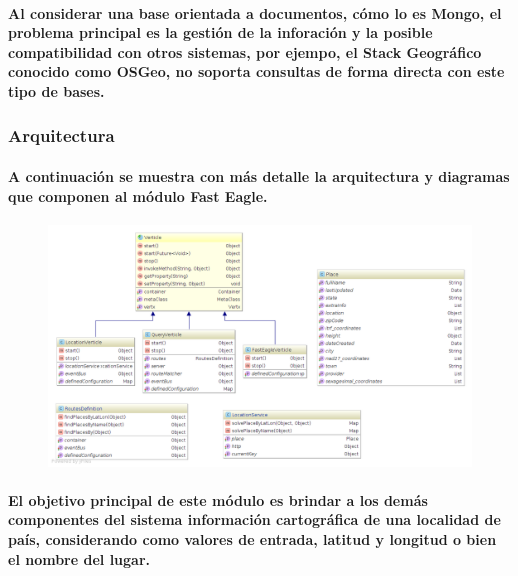     \paragraph{Al considerar una base orientada a documentos, cómo lo es Mongo, el problema principal es la gestión de la inforación y la posible compatibilidad con otros sistemas, por ejempo, el Stack Geográfico conocido como OSGeo\cite{38}, no soporta consultas de forma directa con este tipo de bases.}
  \subsubsection{Arquitectura}
    \paragraph{A continuación se muestra con más detalle la arquitectura y diagramas que componen al módulo Fast Eagle. }
    \begin{figure}[h!]
        \centering
          \includegraphics[width=\textwidth]{./images/FastEagleClassDiagram.png}
    \end{figure}
    \paragraph{El objetivo principal de este módulo es brindar a los demás componentes del sistema información cartográfica de una localidad de país, considerando como valores de entrada, latitud y longitud o bien el nombre del lugar.}
